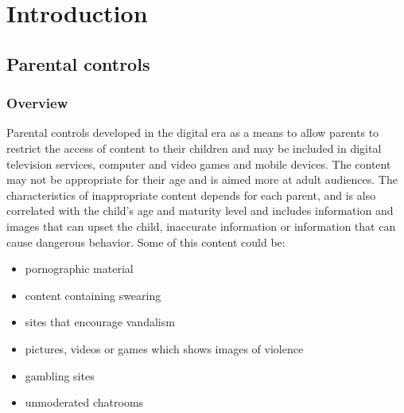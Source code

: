 
\chapter{Introduction} %

\label{Chapter1} %


\newcommand{\keyword}[1]{\textbf{#1}}
\newcommand{\tabhead}[1]{\textbf{#1}}
\newcommand{\code}[1]{\texttt{#1}}
\newcommand{\file}[1]{\texttt{\bfseries#1}}
\newcommand{\option}[1]{\texttt{\itshape#1}}


\section{Parental controls}

\subsection{Overview}
Parental controls developed in the digital era as a means to allow parents to restrict the access of content to their children and may be included in digital television services, computer and video games and mobile devices. The content may not be appropriate for their age and is aimed more at adult audiences. The characteristics of inappropriate content depends for each parent, and is also correlated with the child's age and maturity level and includes information and images that can upset the child, inaccurate information or information that can cause dangerous behavior. Some of this content could be:

\begin{itemize}
\item pornographic material
\item content containing swearing
\item sites that encourage vandalism
\item pictures, videos or games which shows images of violence
\item gambling sites
\item unmoderated chatrooms
\end{itemize}

